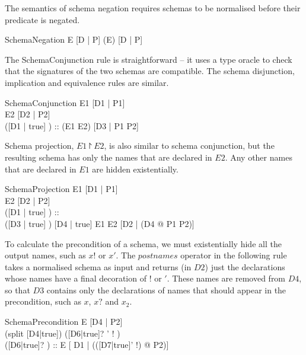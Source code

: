 \documentclass{entcs}
\newcommand{\sexprUnfoldsTo}{\mathrel{=_{se}}}
\newcommand{\is}{\mathrel{is}}
\begin{document}
The semantics of schema negation requires schemas to be
normalised before their predicate is negated.

\begin{zedrule}{SchemaNegation}
  E \sexprUnfoldsTo [D | P]
\derives
  (\lnot E) \sexprUnfoldsTo [D | \lnot P]
\end{zedrule}

The SchemaConjunction rule is straightforward -- it uses a type
oracle to check that the signatures of the two schemas are compatible.
The schema disjunction, implication and equivalence rules are similar.

\begin{zedrule}{SchemaConjunction}
  E1 \sexprUnfoldsTo [D1 | P1] \\
  E2 \sexprUnfoldsTo [D2 | P2] \\
  ([D1 | true] \land [D2 | true]) :: \power [D3 | true]
\derives
  (E1 \land E2) \sexprUnfoldsTo [D3 | P1 \land P2]
\end{zedrule}

Schema projection, $E1 \project E2$, is also similar to schema conjunction,
but the resulting schema has only the names that are declared in $E2$.
Any other names that are declared in $E1$ are hidden existentially.

\begin{zedrule}{SchemaProjection}
  E1 \sexprUnfoldsTo [D1 | P1] \\
  E2 \sexprUnfoldsTo [D2 | P2] \\
  ([D1 | true] \land [D2 | true]) :: \power [D3 | true] \\
  ([D3 | true] \schemaminus [D2 | true]) \is [D4 | true]
\derives
  E1 \project E2 \sexprUnfoldsTo [D2 | (\exists D4 @ P1 \land P2)]
\end{zedrule}

To calculate the precondition of a schema, we must existentially
hide all the output names, such as $x!$ or $x'$.  The $postnames$ 
operator in the following rule takes a normalised schema as input and
returns (in $D2$) just the declarations whose names have a final decoration 
of $!$ or $'$.  These names are removed from $D4$, so that $D3$ contains 
only the declarations of names that should appear in the precondition, 
such as $x$, $x?$ and $x_2$.

\begin{zedrule}{SchemaPrecondition}
  E \sexprUnfoldsTo [D4 | P2] \\
  (split [D4|true]) \is ([D6|true]? \land [D7|true]' \land
                        [D8|true]! \land [D9|true]) \\
  ([D6|true]? \land [D9|true]) :: \power [D1|true]
\derives
  \pre E \sexprUnfoldsTo [ D1 | (\exists ([D7|true]' \land [D8|true]!) @ P2)]
\end{zedrule}
\end{document}
